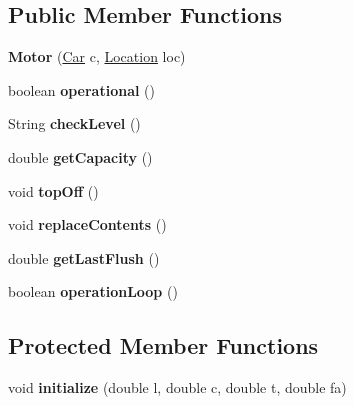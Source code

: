 \subsection*{Public Member Functions}
\begin{DoxyCompactItemize}
\item 
\hypertarget{classPowerTrainParts_1_1Motor_a5c320188ac1722fd18a4664566571a55}{}{\bfseries Motor} (\hyperlink{classCars_1_1Car}{Car} c, \hyperlink{enumEnums_1_1Location}{Location} loc)\label{classPowerTrainParts_1_1Motor_a5c320188ac1722fd18a4664566571a55}

\item 
\hypertarget{classPowerTrainParts_1_1Motor_a85639bd9914f0f8ab5c5ba65274afa03}{}boolean {\bfseries operational} ()\label{classPowerTrainParts_1_1Motor_a85639bd9914f0f8ab5c5ba65274afa03}

\item 
\hypertarget{classPowerTrainParts_1_1Motor_a76f3ccd355a02a56d24c8a8a2d2c1ae1}{}String {\bfseries check\+Level} ()\label{classPowerTrainParts_1_1Motor_a76f3ccd355a02a56d24c8a8a2d2c1ae1}

\item 
\hypertarget{classPowerTrainParts_1_1Motor_a805b4896f775c2cf38e16af9452aadba}{}double {\bfseries get\+Capacity} ()\label{classPowerTrainParts_1_1Motor_a805b4896f775c2cf38e16af9452aadba}

\item 
\hypertarget{classPowerTrainParts_1_1Motor_af917de0ecfc86bc75da51e8c0000ab02}{}void {\bfseries top\+Off} ()\label{classPowerTrainParts_1_1Motor_af917de0ecfc86bc75da51e8c0000ab02}

\item 
\hypertarget{classPowerTrainParts_1_1Motor_ae47c3c485c3e43235bbe395fa48f49b8}{}void {\bfseries replace\+Contents} ()\label{classPowerTrainParts_1_1Motor_ae47c3c485c3e43235bbe395fa48f49b8}

\item 
\hypertarget{classPowerTrainParts_1_1Motor_aed14d360795ca37c260d3665cbc60ae9}{}double {\bfseries get\+Last\+Flush} ()\label{classPowerTrainParts_1_1Motor_aed14d360795ca37c260d3665cbc60ae9}

\item 
\hypertarget{classPowerTrainParts_1_1Motor_a2fd035a5a6ac77fb80938db1d83f1bf7}{}boolean {\bfseries operation\+Loop} ()\label{classPowerTrainParts_1_1Motor_a2fd035a5a6ac77fb80938db1d83f1bf7}

\end{DoxyCompactItemize}
\subsection*{Protected Member Functions}
\begin{DoxyCompactItemize}
\item 
\hypertarget{classPowerTrainParts_1_1Motor_ac3d5a72f24cb136d954c5e887de689f9}{}void {\bfseries initialize} (double l, double c, double t, double fa)\label{classPowerTrainParts_1_1Motor_ac3d5a72f24cb136d954c5e887de689f9}

\end{DoxyCompactItemize}
